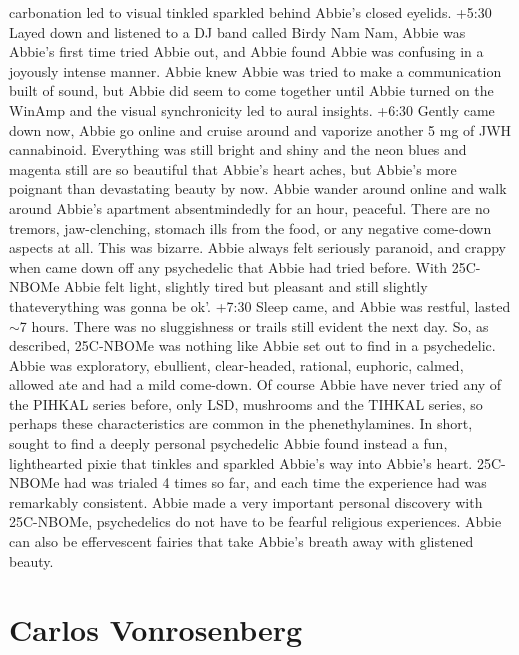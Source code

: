 \documentclass[12pt]{book}
\begin{document}
carbonation led to visual tinkled sparkled behind Abbie's closed eyelids. +5:30 Layed down and listened to a DJ band called Birdy Nam Nam, Abbie was Abbie's first time tried Abbie out, and Abbie found Abbie was confusing in a joyously intense manner. Abbie knew Abbie was tried to make a communication built of sound, but Abbie did seem to come together until Abbie turned on the WinAmp and the visual synchronicity led to aural insights. +6:30 Gently came down now, Abbie go online and cruise around and vaporize another 5 mg of JWH cannabinoid. Everything was still bright and shiny and the neon blues and magenta still are so beautiful that Abbie's heart aches, but Abbie's more poignant than devastating beauty by now. Abbie wander around online and walk around Abbie's apartment absentmindedly for an hour, peaceful. There are no tremors, jaw-clenching, stomach ills from the food, or any negative come-down aspects at all. This was bizarre. Abbie always felt seriously paranoid, and crappy when came down off any psychedelic that Abbie had tried before. With 25C-NBOMe Abbie felt light, slightly tired but pleasant and still slightly thateverything was gonna be ok'. +7:30 Sleep came, and Abbie was restful, lasted $\sim$7 hours. There was no sluggishness or trails still evident the next day. So, as described, 25C-NBOMe was nothing like Abbie set out to find in a psychedelic. Abbie was exploratory, ebullient, clear-headed, rational, euphoric, calmed, allowed ate and had a mild come-down. Of course Abbie have never tried any of the PIHKAL series before, only LSD, mushrooms and the TIHKAL series, so perhaps these characteristics are common in the phenethylamines. In short, sought to find a deeply personal psychedelic Abbie found instead a fun, lighthearted pixie that tinkles and sparkled Abbie's way into Abbie's heart. 25C-NBOMe had was trialed 4 times so far, and each time the experience had was remarkably consistent. Abbie made a very important personal discovery with 25C-NBOMe, psychedelics do not have to be fearful religious experiences. Abbie can also be effervescent fairies that take Abbie's breath away with glistened beauty.



\chapter{Carlos Vonrosenberg}
\end{document}
